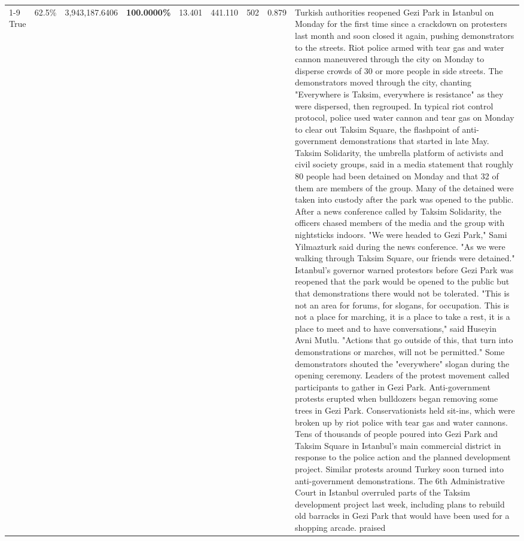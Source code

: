 \begin{table}[H]
\begin{tabular}{lllrlllll}
\cline{1-9}
True & 62.5\% & 3,943,187.6406 & \bfseries \color{red} 100.0000\% & 13.401 & 441.110 & 502 & 0.879 & Turkish authorities reopened Gezi Park in Istanbul on Monday for the first time since a crackdown on protesters last month and soon closed it again, pushing demonstrators to the streets. Riot police armed with tear gas and water cannon maneuvered through the city on Monday to disperse crowds of 30 or more people in side streets. The demonstrators moved through the city, chanting "Everywhere is Taksim, everywhere is resistance" as they were dispersed, then regrouped. In typical riot control protocol, police used water cannon and tear gas on Monday to clear out Taksim Square, the flashpoint of anti-government demonstrations that started in late May. Taksim Solidarity, the umbrella platform of activists and civil society groups, said in a media statement that roughly 80 people had been detained on Monday and that 32 of them are members of the group. Many of the detained were taken into custody after the park was opened to the public. After a news conference called by Taksim Solidarity, the officers chased members of the media and the group with nightsticks indoors. "We were headed to Gezi Park," Sami Yilmazturk said during the news conference. "As we were walking through Taksim Square, our friends were detained." Istanbul's governor warned protestors before Gezi Park was reopened that the park would be opened to the public but that demonstrations there would not be tolerated. "This is not an area for forums, for slogans, for occupation. This is not a place for marching, it is a place to take a rest, it is a place to meet and to have conversations," said Huseyin Avni Mutlu. "Actions that go outside of this, that turn into demonstrations or marches, will not be permitted." Some demonstrators shouted the "everywhere" slogan during the opening ceremony. Leaders of the protest movement called participants to gather in Gezi Park. Anti-government protests erupted when bulldozers began removing some trees in Gezi Park. Conservationists held sit-ins, which were broken up by riot police with tear gas and water cannons. Tens of thousands of people poured into Gezi Park and Taksim Square in Istanbul's main commercial district in response to the police action and the planned development project. Similar protests around Turkey soon turned into anti-government demonstrations. The 6th Administrative Court in Istanbul overruled parts of the Taksim development project last week, including plans to rebuild old barracks in Gezi Park that would have been used for a shopping arcade. praised \\

\end{tabular}
\end{table}
